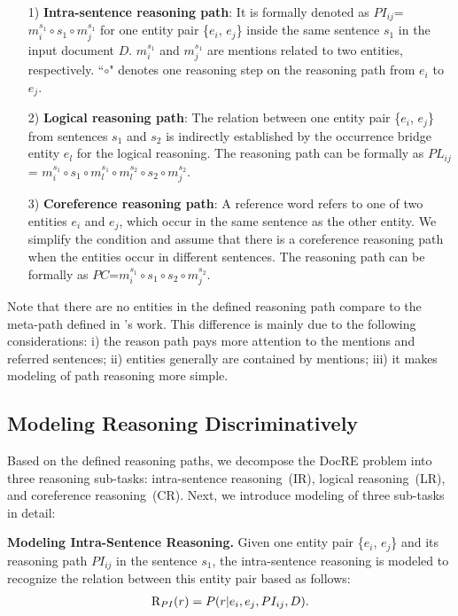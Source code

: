 \documentclass[11pt,a4paper]{article}
\begin{document}
\begin{enumerate}
\item[1)] \textbf{Intra-sentence reasoning path}: It is formally denoted as $PI_{ij}$=$m_i^{s_1} \circ s_1 \circ m_j^{s_1}$ for one entity pair \{$e_i$, $e_{j}$\} inside the same sentence $s_1$ in the input document $D$. 
$m_i^{s_1}$ and $m_j^{s_1}$ are mentions related to two entities, respectively. 
``$\circ$" denotes one reasoning step on the reasoning path from $e_i$ to $e_{j}$.

\item[2)] \textbf{Logical reasoning path}: The relation between one entity pair \{$e_i$, $e_{j}$\} from sentences ${s_1}$ and ${s_2}$ is indirectly established by the occurrence bridge entity $e_l$ for the logical reasoning.
The reasoning path can be formally as $PL_{ij}$=
$m_i^{s_1} \circ s_1 \circ m_l^{s_1} \circ m_l^{s_2} \circ s_2 \circ m_j^{s_2}$.

\item[3)] \textbf{Coreference reasoning path}: 
A reference word refers to one of two entities $e_i$ and $e_{j}$, which occur in the same sentence as the other entity.
We simplify the condition and assume that there is a coreference reasoning path when the entities occur in different sentences.
The reasoning path can be formally as $PC$=$m_i^{s_1} \circ s_1 \circ s_2 \circ m_j^{s_2}$.

\end{enumerate}
Note that there are no entities in the defined reasoning path compare to the meta-path defined in \citeauthor{docred-rec}'s work.
This difference is mainly due to the following considerations: i) the reason path pays more attention to the mentions and referred sentences; ii) entities generally are contained by mentions; iii) it makes modeling of path reasoning more simple.

\subsection{Modeling Reasoning Discriminatively}
\label{sec2-2}
Based on the defined reasoning paths, we decompose the DocRE problem into three reasoning sub-tasks: intra-sentence reasoning~(IR), logical reasoning~(LR), and coreference reasoning~(CR).
Next, we introduce modeling of three sub-tasks in detail:

\noindent\textbf{Modeling Intra-Sentence Reasoning.}
Given one entity pair \{$e_i$, $e_j$\} and its reasoning path $PI_{ij}$ in the sentence $s_1$, the intra-sentence reasoning is modeled to recognize the relation between this entity pair based as follows:
\begin{equation}
\begin{aligned}
\textup{R}_{PI}(r)=P(r|e_i, e_j, PI_{ij}, D).
\label{eq:reasontask1}
\end{aligned}
\end{equation}
\end{document}
